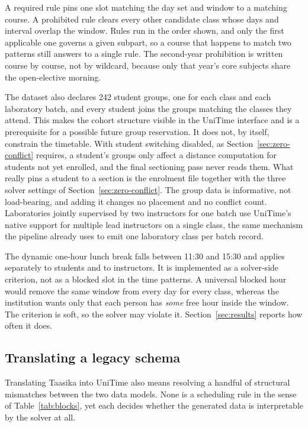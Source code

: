 \documentclass[journal]{IEEEtran}
\begin{document}
A required rule pins one slot matching the day set and window to a matching course. A prohibited rule clears every other candidate class whose days and interval overlap the window. Rules run in the order shown, and only the first applicable one governs a given subpart, so a course that happens to match two patterns still answers to a single rule. The second-year prohibition is written course by course, not by wildcard, because only that year's core subjects share the open-elective morning.

The dataset also declares 242 student groups, one for each class and each laboratory batch, and every student joins the groups matching the classes they attend. This makes the cohort structure visible in the UniTime interface and is a prerequisite for a possible future group reservation. It does not, by itself, constrain the timetable. With student switching disabled, as Section~\ref{sec:zero-conflict} requires, a student's groups only affect a distance computation for students not yet enrolled, and the final sectioning pass never reads them. What really pins a student to a section is the enrolment file together with the three solver settings of Section~\ref{sec:zero-conflict}. The group data is informative, not load-bearing, and adding it changes no placement and no conflict count. Laboratories jointly supervised by two instructors for one batch use UniTime's native support for multiple lead instructors on a single class, the same mechanism the pipeline already uses to emit one laboratory class per batch record.

The dynamic one-hour lunch break falls between 11:30 and 15:30 and applies separately to students and to instructors. It is implemented as a solver-side criterion, not as a blocked slot in the time patterns. A universal blocked hour would remove the same window from every day for every class, whereas the institution wants only that each person has \emph{some} free hour inside the window. The criterion is soft, so the solver may violate it. Section~\ref{sec:results} reports how often it does.

\subsection{Translating a legacy schema}
Translating Taasika into UniTime also means resolving a handful of structural mismatches between the two data models. None is a scheduling rule in the sense of Table~\ref{tab:blocks}, yet each decides whether the generated data is interpretable by the solver at all.
\end{document}
